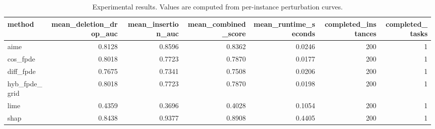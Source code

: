 \begin{table}[t]
\caption{Experimental results. Values are computed from per-instance perturbation curves.}
\label{tab:main_results_computed}
\centering
\begin{tabular}{lrrrrrr}
\toprule
method & mean\_deletion\_drop\_auc & mean\_insertion\_auc & mean\_combined\_score & mean\_runtime\_seconds & completed\_instances & completed\_tasks \\
\midrule
aime & 0.8128 & 0.8596 & 0.8362 & 0.0246 & 200 & 1 \\
cos\_fpde & 0.8018 & 0.7723 & 0.7870 & 0.0177 & 200 & 1 \\
diff\_fpde & 0.7675 & 0.7341 & 0.7508 & 0.0206 & 200 & 1 \\
hyb\_fpde\_grid & 0.8018 & 0.7723 & 0.7870 & 0.0198 & 200 & 1 \\
lime & 0.4359 & 0.3696 & 0.4028 & 0.1054 & 200 & 1 \\
shap & 0.8438 & 0.9377 & 0.8908 & 0.4405 & 200 & 1 \\
\bottomrule
\end{tabular}

\end{table}
